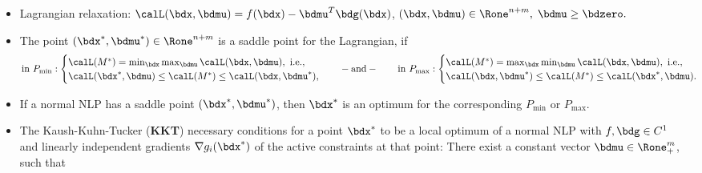 \documentclass[a4paper]{article}
\begin{document}
 \begin{itemize}
   \item Lagrangian relaxation:
    $
      \calL(\bdx,\bdmu)
      = f(\bdx)
      -
      \bdmu^T\bdg(\bdx)
  $,
  $
  (\bdx,\bdmu)\in\Rone^{n+m},\;
    \bdmu\ge\bdzero.
   $

  \item The point $(\bdx^*,\bdmu^*)\in\Rone^{n+m}$ is a saddle point for the Lagrangian, if
    \[
      \text{in}~P_{\min}:
      \begin{cases}
          \calL(M^*) = \min_{\bdx}\max_{\bdmu} \calL(\bdx  ,\bdmu),~\text{i.e.}, \\
          \calL(\bdx^*,\bdmu  ) \le \calL(M^*) \le \calL(\bdx  ,\bdmu^*),
        \end{cases}
        \hspace{1em}
        -\text{and}-
        \hspace{2em}
      \text{in}~P_{\max}:
        \begin{cases}
          \calL(M^*) = \max_{\bdx}\min_{\bdmu} \calL(\bdx  ,\bdmu),~\text{i.e.}, \\
          \calL(\bdx  ,\bdmu^*) \le \calL(M^*) \le \calL(\bdx^*,\bdmu).
      \end{cases}
    \]

    \item If a normal NLP has a saddle point $(\bdx^*,\bdmu^*)$, then $\bdx^*$
    is an optimum for the corresponding
    $P_{\min}$ or
    $P_{\max}$.

  \item The Kaush-Kuhn-Tucker (\textbf{KKT}) necessary conditions
    for a point $\bdx^*$ to be a local optimum of a normal NLP
    with $f,\bdg\in C^1$ and linearly independent gradients $\nabla g_i(\bdx^*)$
    of the active constraints at that point: There exist a constant
    vector $\bdmu\in\Rone^m_+$, such that


\end{itemize}
\end{document}
